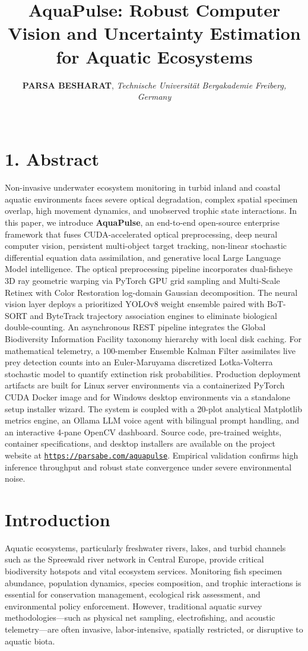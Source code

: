 \documentclass[11pt,a4paper]{article}
\title{\vspace{-0.5cm}\textbf{\huge AquaPulse: Robust Computer Vision and Uncertainty Estimation for Aquatic Ecosystems}}
\author{\textbf{\large PARSA BESHARAT}, \textit{Technische Universität Bergakademie Freiberg, Germany}\\[0.15cm]
\emailtext{parsabe99@gmail.com}\\[0.05cm]
\urltext{https://parsabe.com/aquapulse}}
\date{}
\newcommand{\urltext}[1]{\href{#1}{{\color{linkblue}\underline{\texttt{#1}}}}}
\begin{document}
\maketitle

\section*{1. Abstract}
Non-invasive underwater ecosystem monitoring in turbid inland and coastal aquatic environments faces severe optical degradation, complex spatial specimen overlap, high movement dynamics, and unobserved trophic state interactions. In this paper, we introduce \textbf{AquaPulse}, an end-to-end open-source enterprise framework that fuses CUDA-accelerated optical preprocessing, deep neural computer vision, persistent multi-object target tracking, non-linear stochastic differential equation data assimilation, and generative local Large Language Model intelligence. The optical preprocessing pipeline incorporates dual-fisheye 3D ray geometric warping via PyTorch GPU grid sampling and Multi-Scale Retinex with Color Restoration log-domain Gaussian decomposition. The neural vision layer deploys a prioritized YOLOv8 weight ensemble paired with BoT-SORT and ByteTrack trajectory association engines to eliminate biological double-counting. An asynchronous REST pipeline integrates the Global Biodiversity Information Facility taxonomy hierarchy with local disk caching. For mathematical telemetry, a 100-member Ensemble Kalman Filter assimilates live prey detection counts into an Euler-Maruyama discretized Lotka-Volterra stochastic model to quantify extinction risk probabilities. Production deployment artifacts are built for Linux server environments via a containerized PyTorch CUDA Docker image and for Windows desktop environments via a standalone setup installer wizard. The system is coupled with a 20-plot analytical Matplotlib metrics engine, an Ollama LLM voice agent with bilingual prompt handling, and an interactive 4-pane OpenCV dashboard. Source code, pre-trained weights, container specifications, and desktop installers are available on the project website at \urltext{https://parsabe.com/aquapulse}. Empirical validation confirms high inference throughput and robust state convergence under severe environmental noise.

\vspace{0.3cm}

\section{Introduction}
Aquatic ecosystems, particularly freshwater rivers, lakes, and turbid channels such as the Spreewald river network in Central Europe, provide critical biodiversity hotspots and vital ecosystem services. Monitoring fish specimen abundance, population dynamics, species composition, and trophic interactions is essential for conservation management, ecological risk assessment, and environmental policy enforcement. However, traditional aquatic survey methodologies—such as physical net sampling, electrofishing, and acoustic telemetry—are often invasive, labor-intensive, spatially restricted, or disruptive to aquatic biota.
\end{document}
